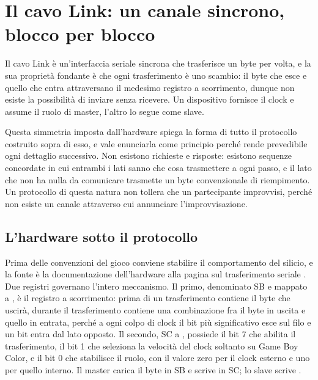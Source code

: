 
\chapter{Il cavo Link: un canale sincrono, blocco per blocco}
\label{cap:cavo}

Il cavo Link è un'interfaccia seriale sincrona che trasferisce un byte per volta, e la sua proprietà fondante è che ogni trasferimento è uno scambio: il byte che esce e quello che entra attraversano il medesimo registro a scorrimento, dunque non esiste la possibilità di inviare senza ricevere. Un dispositivo fornisce il clock e assume il ruolo di master, l'altro lo segue come slave.

Questa simmetria imposta dall'hardware spiega la forma di tutto il protocollo costruito sopra di esso, e vale enunciarla come principio perché rende prevedibile ogni dettaglio successivo. Non esistono richieste e risposte: esistono sequenze concordate in cui entrambi i lati sanno che cosa trasmettere a ogni passo, e il lato che non ha nulla da comunicare trasmette un byte convenzionale di riempimento. Un protocollo di questa natura non tollera che un partecipante improvvisi, perché non esiste un canale attraverso cui annunciare l'improvvisazione.

\section{L'hardware sotto il protocollo}

Prima delle convenzioni del gioco conviene stabilire il comportamento del silicio, e la fonte è la documentazione dell'hardware alla pagina sul trasferimento seriale \cite{pandocs}. Due registri governano l'intero meccanismo. Il primo, denominato SB e mappato a , è il registro a scorrimento: prima di un trasferimento contiene il byte che uscirà, durante il trasferimento contiene una combinazione fra il byte in uscita e quello in entrata, perché a ogni colpo di clock il bit più significativo esce sul filo e un bit entra dal lato opposto. Il secondo, SC a , possiede il bit 7 che abilita il trasferimento, il bit 1 che seleziona la velocità del clock soltanto su Game Boy Color, e il bit 0 che stabilisce il ruolo, con il valore zero per il clock esterno e uno per quello interno. Il master carica il byte in SB e scrive  in SC; lo slave scrive .

